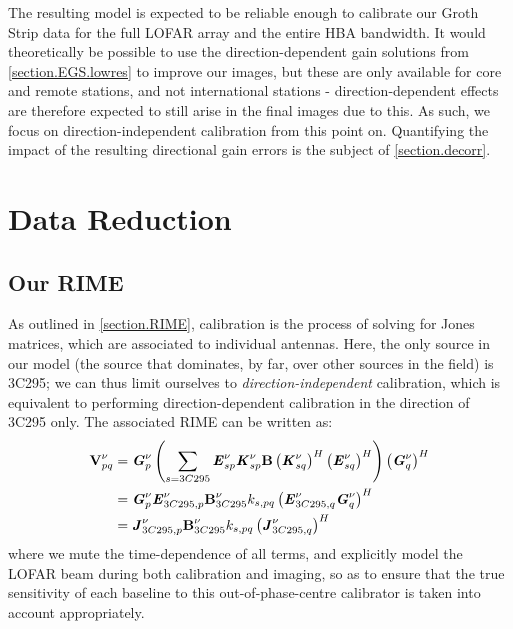 \pg
The resulting model is expected to be reliable enough to calibrate our Groth Strip data for the full LOFAR array and the entire HBA bandwidth. It would theoretically be possible to use the direction-dependent gain solutions from \cref{section.EGS.lowres} to improve our images, but these are only available for core and remote stations, and not international stations - direction-dependent effects are therefore expected to still arise in the final images due to this. As such, we focus on direction-independent calibration from this point on. Quantifying the impact of the resulting directional gain errors is the subject of \cref{section.decorr}.

\section{Data Reduction}

\subsection{Our RIME}

\pg
As outlined in \cref{section.RIME}, calibration is the process of solving for Jones matrices, which are associated to individual antennas. Here, the only source in our model (the source that dominates, by far, over other sources in the field) is 3C295; we can thus limit ourselves to \textit{direction-independent} calibration, which is equivalent to performing direction-dependent calibration in the direction of 3C295 only. The associated RIME can be written as:
\begin{align}
\textbf{V}_{pq}^{\nu} &= \textbf{\emph{G}}_p^{\nu} \left( \sum_{s=3C295} \textbf{\emph{E}}_{sp}^{\nu} \textbf{\emph{K}}_{sp}^{\nu} \textbf{B} \left(\textbf{\emph{K}}_{sq}^{\nu}\right)^H \left(\textbf{\emph{E}}_{sq}^{\nu}\right)^H \right) \left(\textbf{\emph{G}}_q^{\nu}\right)^H\\
		  &= \textbf{\emph{G}}_p^{\nu} \textbf{\emph{E}}_{3C295,p}^{\nu} \textbf{B}_{3C295}^{\nu} k_{s,pq}\left(\textbf{\emph{E}}_{3C295,q}^{\nu} \textbf{\emph{G}}_q^{\nu}\right)^H\\
		  &= \textbf{\emph{J}}_{3C295,p}^{\nu} \textbf{B}_{3C295}^{\nu}k_{s,pq} \left(\textbf{\emph{J}}_{3C295,q}^{\nu}\right)^H\label{3c295.dirin.cal}
\end{align}
where we mute the time-dependence of all terms, and explicitly model the LOFAR beam during both calibration and imaging, so as to ensure that the true sensitivity of each baseline to this out-of-phase-centre calibrator is taken into account appropriately.

